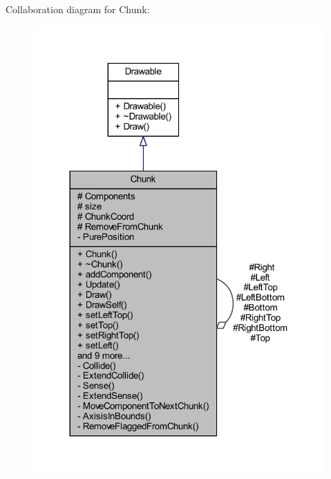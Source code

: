 Collaboration diagram for Chunk\-:
\nopagebreak
\begin{figure}[H]
\begin{center}
\leavevmode
\includegraphics[width=317pt]{class_chunk__coll__graph}
\end{center}
\end{figure}

